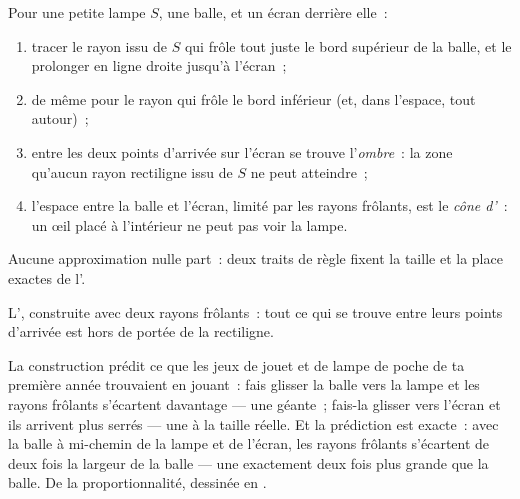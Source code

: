 \begin{method}\label{met:g6:light-propagation:shadow}
Pour une petite lampe $S$, une balle, et un écran derrière elle~:
\begin{enumerate}
  \item tracer le rayon issu de $S$ qui frôle tout juste le bord
        supérieur de la balle, et le prolonger en ligne droite
        jusqu'à l'écran~;
  \item de même pour le rayon qui frôle le bord inférieur (et,
        dans l'espace, tout autour)~;
  \item entre les deux points d'arrivée sur l'écran se trouve
        l'\emph{ombre}~: la zone qu'aucun rayon
        rectiligne issu de $S$ ne peut atteindre~;
  \item l'espace entre la balle et l'écran, limité par les rayons
        frôlants, est le \emph{cône d'}~: un œil placé à
        l'intérieur ne peut pas voir la lampe.
\end{enumerate}
Aucune approximation nulle part~: deux traits de règle fixent la
taille et la place exactes de l'.
\end{method}

\begin{omfigure}

{\small L', construite avec deux rayons frôlants~: tout ce qui
se trouve entre leurs points d'arrivée est hors de portée de la
 rectiligne.}
\end{omfigure}

\begin{example}\label{ex:g6:light-propagation:sizes}
La construction prédit ce que les jeux de jouet et de lampe de poche
de ta première année trouvaient en jouant~: fais glisser la balle
vers la lampe et les rayons frôlants s'écartent davantage --- une
 géante~; fais-la glisser vers l'écran et ils arrivent plus
serrés --- une  à la taille réelle. Et la prédiction est
exacte~: avec la balle à mi-chemin de la lampe et de l'écran, les
rayons frôlants s'écartent de deux fois la largeur de la balle ---
une  exactement deux fois plus grande que la balle. De la
proportionnalité, dessinée en .
\end{example}

